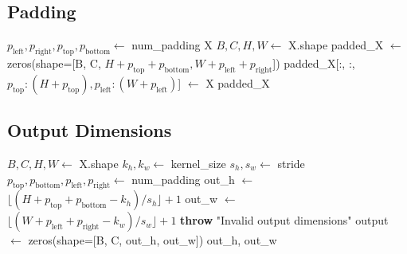 \documentclass{article}
\begin{document}
\subsection{Padding}
\begin{algorithm}
\caption{Pad Input}
\begin{algorithmic}[1]
    \State $p_{\text{left}}, p_{\text{right}}, p_{\text{top}}, p_{\text{bottom}} \gets$ num_padding
        \State \Return X
    \EndIf
    \State $B, C, H, W \gets$ X.shape
    \State padded_X $\gets$ zeros(shape=[B, C, $H + p_{\text{top}} + p_{\text{bottom}}, W + p_{\text{left}} + p_{\text{right}}$])
    \State padded_X[:, :, $p_{\text{top}}:(H+p_{\text{top}}), p_{\text{left}}:(W+p_{\text{left}})$] $\gets$ X
    \State \Return padded_X
\EndFunction
\end{algorithmic}
\end{algorithm}

\subsection{Output Dimensions}
\begin{algorithm}
\caption{Initialize Output}
\begin{algorithmic}[1]
    \State $B, C, H, W \gets$ X.shape
    \State $k_h, k_w \gets$ kernel_size
    \State $s_h, s_w \gets$ stride
    \State $p_{\text{top}}, p_{\text{bottom}}, p_{\text{left}}, p_{\text{right}} \gets$ num_padding
    \State out_h $\gets$ $\lfloor (H + p_{\text{top}} + p_{\text{bottom}} - k_h) / s_h \rfloor + 1$
    \State out_w $\gets$ $\lfloor (W + p_{\text{left}} + p_{\text{right}} - k_w) / s_w \rfloor + 1$
        \State \textbf{throw} "Invalid output dimensions"
    \EndIf
    \State output $\gets$ zeros(shape=[B, C, out_h, out_w])
    \State \Return out_h, out_w
\EndFunction
\end{algorithmic}
\end{algorithm}
\end{document}
